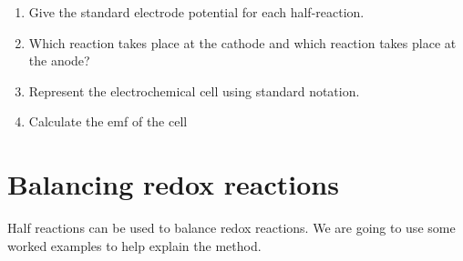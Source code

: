 {\begin{enumerate}
	\begin{enumerate}
	\item{Give the standard electrode potential for each half-reaction.}
	\item{Which reaction takes place at the cathode and which reaction takes place at the anode?}
	\item{Represent the electrochemical cell using standard notation.}
	\item{Calculate the emf of the cell}
	\end{enumerate}

\end{enumerate}
}






\section{Balancing redox reactions}
\label{sec:electrochemical:balancing}

Half reactions can be used to balance redox reactions. We are going to use some worked examples to help explain the method.

